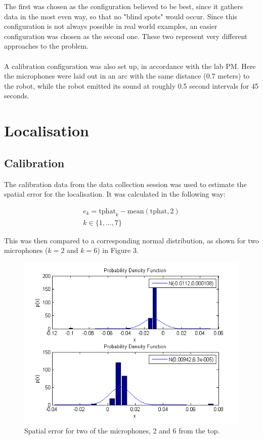 \documentclass[11pt]{article}
\begin{document}
\newpage
The first was chosen as the configuration believed to be best, since it gathers data in the most even way, so that no "blind spots" would occur. Since this configuration is not always possible in real world examples, an easier configuration was chosen as the second one. These two represent very different approaches to the problem.\\\\
A calibration configuration was also set up, in accordance with the lab PM. Here the microphones were laid out in an arc with the same distance (0.7 meters) to the robot, while the robot emitted its sound at roughly 0.5 second intervals for 45 seconds.
\section{Localisation}
\subsection{Calibration}
The calibration data from the data collection session was used to estimate the spatial error for the localisation. It was calculated in the following way:

\begin{align*}
e_k = \text{tphat}_k-\text{mean}(\text{tphat}, 2)\\
k \in \{1,...,7\}
\end{align*}

This was then compared to a corresponding normal distribution, as shown for two microphones ($k=2$ and $k=6$) in Figure 3. 

\begin{figure}
\begin{center}
  \includegraphics{calibration_ndist_2_and_6.png}
  \caption{Spatial error for two of the microphones, 2 and 6 from the top.}
  \end{center}
\end{figure}
\end{document}
